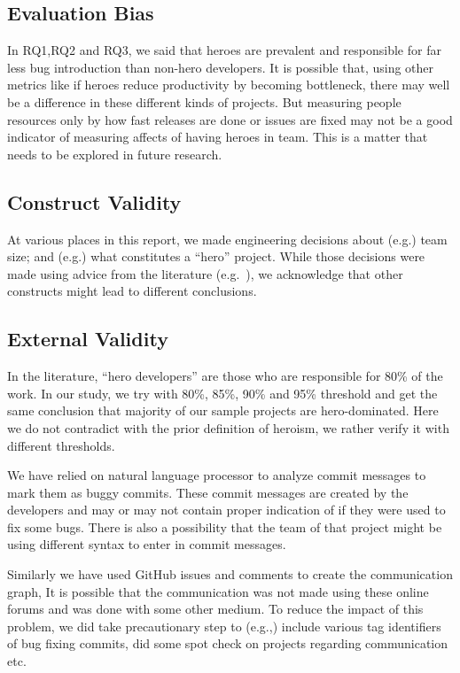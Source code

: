 \documentclass[smallextended]{svjour3}
\begin{document}
     \subsection{Evaluation Bias} In  RQ1,RQ2 and RQ3, we said that heroes are prevalent and responsible for far less bug introduction than non-hero developers.
     It is possible that, using other metrics like if heroes reduce productivity by becoming bottleneck, there may well be a difference in these different kinds of projects. But measuring people resources only by how fast releases are done or issues are fixed may not be a good indicator of measuring affects of having heroes in team. This is a matter that needs to be explored in future research. 

         \subsection{Construct Validity} At various places in this report, we made engineering decisions about (e.g.) team size; and (e.g.) what constitutes a ``hero'' project. While those decisions were made using advice from the literature (e.g.~\cite{gautam2017empirical}), we acknowledge that other constructs might lead to different conclusions. 
     

\subsection{External Validity} 
In the literature, ``hero developers'' are those who are responsible for 80\% of the work. In our study, we try with 80\%, 85\%, 90\% and 95\% threshold and get the same conclusion that majority of our sample projects are hero-dominated. Here we do not contradict with the prior definition of heroism, we rather verify it with different thresholds.


We have relied on natural language processor to analyze commit messages to mark them as buggy commits. These commit messages are created by the developers and may or may not contain proper indication of if they were used to fix some bugs. There is also a possibility that the team of that project might be using different syntax to enter in commit messages.

Similarly we have used GitHub issues and comments to create the communication graph, It is possible that the communication was not made using these online forums and was done with some other medium. To reduce the impact of this problem, we  did take precautionary step to (e.g.,) include various tag identifiers of bug fixing commits, did some spot check on projects regarding communication etc.
\end{document}
